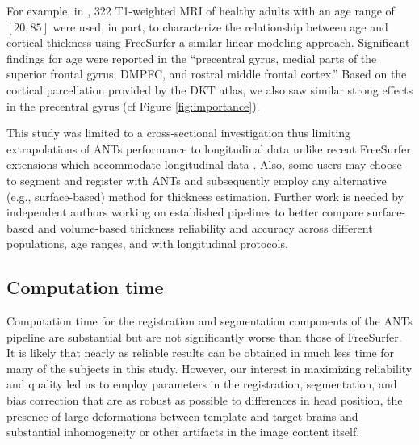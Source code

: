 For example, in \cite{hogstrom2013},
322 T1-weighted MRI of healthy adults with an age range of $[20,85]$ were 
used, in part, to characterize the relationship between age and cortical 
thickness using FreeSurfer a similar linear modeling approach.  Significant findings
for age were reported in the ``precentral gyrus, medial parts of the 
superior frontal gyrus, DMPFC, and rostral middle frontal cortex.'' Based
on the cortical parcellation provided by the DKT atlas, we also saw similar
strong effects in the precentral gyrus (cf Figure \ref{fig:importance}).



This study was limited to a cross-sectional investigation thus limiting
extrapolations of ANTs performance to longitudinal data unlike
recent FreeSurfer extensions which accommodate longitudinal data \citep{reuter2012,jovicich2013}.  
Also, some users may choose to segment and register
with ANTs and subsequently employ any alternative (e.g., surface-based)
method for thickness estimation.  Further work is needed by
independent authors working on established pipelines 
to better compare surface-based and volume-based thickness reliability
and accuracy across different populations, age ranges, and with 
longitudinal protocols. 

\subsection{Computation time}
Computation time for the registration and segmentation components of
the ANTs pipeline are substantial but are not significantly worse than
those of FreeSurfer.  It is likely that nearly as reliable
results can be obtained in much less time for many of the subjects in
this study.  However, our interest in
maximizing reliability and quality led us to employ parameters in the
registration, segmentation, and bias correction that are as robust as
possible to differences in head position, the presence of large
deformations between template and target brains and substantial
inhomogeneity or other artifacts in the image content itself.  

